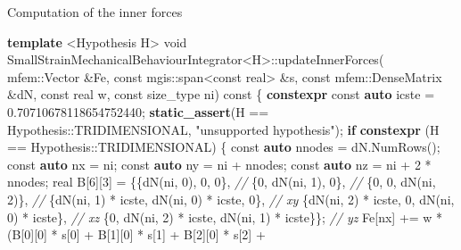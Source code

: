 \documentclass{beamer}
\newenvironment{Shaded}{}{}
\newcommand{\AttributeTok}[1]{\textcolor[rgb]{0.49,0.56,0.16}{#1}}
\newcommand{\CommentTok}[1]{\textcolor[rgb]{0.38,0.63,0.69}{\textit{#1}}}
\newcommand{\ControlFlowTok}[1]{\textcolor[rgb]{0.00,0.44,0.13}{\textbf{#1}}}
\newcommand{\DataTypeTok}[1]{\textcolor[rgb]{0.56,0.13,0.00}{#1}}
\newcommand{\DecValTok}[1]{\textcolor[rgb]{0.25,0.63,0.44}{#1}}
\newcommand{\FloatTok}[1]{\textcolor[rgb]{0.25,0.63,0.44}{#1}}
\newcommand{\KeywordTok}[1]{\textcolor[rgb]{0.00,0.44,0.13}{\textbf{#1}}}
\newcommand{\NormalTok}[1]{#1}
\newcommand{\StringTok}[1]{\textcolor[rgb]{0.25,0.44,0.63}{#1}}
\begin{document}
\begin{frame}[fragile]{Computation of the inner forces}
\protect\hypertarget{computation-of-the-inner-forces}{}
\begin{Shaded}
\begin{Highlighting}[]
  \KeywordTok{template}\NormalTok{ \textless{}Hypothesis H\textgreater{}}
  \DataTypeTok{void}\NormalTok{ SmallStrainMechanicalBehaviourIntegrator\textless{}H\textgreater{}::updateInnerForces(}
\NormalTok{      mfem::Vector \&Fe,}
      \AttributeTok{const}\NormalTok{ mgis::span\textless{}}\AttributeTok{const}\NormalTok{ real\textgreater{} \&s,}
      \AttributeTok{const}\NormalTok{ mfem::DenseMatrix \&dN,}
      \AttributeTok{const}\NormalTok{ real w,}
      \AttributeTok{const} \DataTypeTok{size\_type}\NormalTok{ ni) }\AttributeTok{const}\NormalTok{ \{}
    \KeywordTok{constexpr} \AttributeTok{const} \KeywordTok{auto}\NormalTok{ icste = }\FloatTok{0.70710678118654752440}\NormalTok{;}
    \KeywordTok{static\_assert}\NormalTok{(H == Hypothesis::TRIDIMENSIONAL, }\StringTok{"unsupported hypothesis"}\NormalTok{);}
    \ControlFlowTok{if} \KeywordTok{constexpr}\NormalTok{ (H == Hypothesis::TRIDIMENSIONAL) \{}
      \AttributeTok{const} \KeywordTok{auto}\NormalTok{ nnodes = dN.NumRows();}
      \AttributeTok{const} \KeywordTok{auto}\NormalTok{ nx = ni;}
      \AttributeTok{const} \KeywordTok{auto}\NormalTok{ ny = ni + nnodes;}
      \AttributeTok{const} \KeywordTok{auto}\NormalTok{ nz = ni + }\DecValTok{2}\NormalTok{ * nnodes;}
\NormalTok{      real B[}\DecValTok{6}\NormalTok{][}\DecValTok{3}\NormalTok{] = \{\{dN(ni, }\DecValTok{0}\NormalTok{), }\DecValTok{0}\NormalTok{, }\DecValTok{0}\NormalTok{\},                          }\CommentTok{//}
\NormalTok{                      \{}\DecValTok{0}\NormalTok{, dN(ni, }\DecValTok{1}\NormalTok{), }\DecValTok{0}\NormalTok{\},                          }\CommentTok{//}
\NormalTok{                      \{}\DecValTok{0}\NormalTok{, }\DecValTok{0}\NormalTok{, dN(ni, }\DecValTok{2}\NormalTok{)\},                          }\CommentTok{//}
\NormalTok{                      \{dN(ni, }\DecValTok{1}\NormalTok{) * icste, dN(ni, }\DecValTok{0}\NormalTok{) * icste, }\DecValTok{0}\NormalTok{\},  }\CommentTok{// xy}
\NormalTok{                      \{dN(ni, }\DecValTok{2}\NormalTok{) * icste, }\DecValTok{0}\NormalTok{, dN(ni, }\DecValTok{0}\NormalTok{) * icste\},  }\CommentTok{// xz}
\NormalTok{                      \{}\DecValTok{0}\NormalTok{, dN(ni, }\DecValTok{2}\NormalTok{) * icste, dN(ni, }\DecValTok{1}\NormalTok{) * icste\}\}; }\CommentTok{// yz}
\NormalTok{      Fe[nx] += w * (B[}\DecValTok{0}\NormalTok{][}\DecValTok{0}\NormalTok{] * s[}\DecValTok{0}\NormalTok{] + B[}\DecValTok{1}\NormalTok{][}\DecValTok{0}\NormalTok{] * s[}\DecValTok{1}\NormalTok{] + B[}\DecValTok{2}\NormalTok{][}\DecValTok{0}\NormalTok{] * s[}\DecValTok{2}\NormalTok{] +}

\end{Highlighting}
\end{Shaded}
\end{frame}
\end{document}
